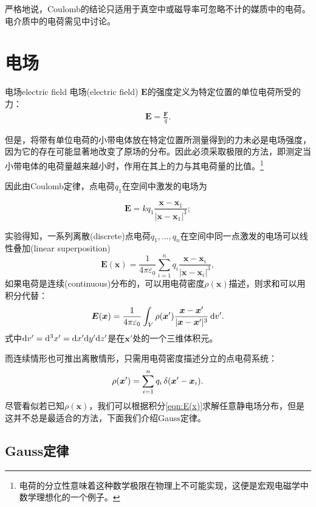 严格地说，Coulomb的结论只适用于真空中或磁导率可忽略不计的媒质中的电荷。电介质中的电荷需见中讨论。

\section{电场}

\begin{definition}{电场}{electric field}
    电场(electric field) $\bm E$的强度定义为特定位置的单位电荷所受的力：
    \begin{align}
        \bm E=\frac{\bm F}q.%
    \end{align}
\end{definition}
但是，将带有单位电荷的小带电体放在特定位置所测量得到的力未必是电场强度，因为它的存在可能显著地改变了原场的分布。因此必须采取极限的方法，即测定当小带电体的电荷量越来越小时，作用在其上的力与其电荷量的比值。\footnote{电荷的分立性意味着这种数学极限在物理上不可能实现，这便是宏观电磁学中数学理想化的一个例子。}

因此由Coulomb定律，点电荷$q_1$在空间中激发的电场为

\begin{equation}
    \label{eqn:E of q}
    \bm E=kq_1\frac{\bm x-\bm x_1}{|\bm x-\bm x_1|^3};
\end{equation}

实验得知，一系列离散(discrete)点电荷$q_1,\ldots,q_n$在空间中同一点激发的电场可以线性叠加(linear superposition)
\[
    \bm E(\bm x)=\frac1{4\pi\varepsilon_0}\sum_{i=1}^nq_i\frac{\bm x-\bm x_i}{|\bm x-\bm x_i|^3},
\]
如果电荷是连续(continuous)分布的，可以用电荷密度$\rho(\bm x)$描述，则求和可以用积分代替：
\begin{align}
    \label{eqn:E(x)}
    \bm E(\bm x)=\frac1{4\pi\varepsilon_0}\int_V\rho(\bm x')\frac{\bm x-\bm x'}{|\bm x-\bm x'|^3}\mathop{}\!\mathrm{d} v'.
\end{align}
式中$\mathop{}\!\mathrm{d} v'=\mathop{}\!\mathrm{d}^3x'=\mathop{}\!\mathrm{d} x'\mathrm{d} y'\mathrm{d} z'$是在$\bm x'$处的一个三维体积元。

而连续情形也可推出离散情形，只需用电荷密度描述分立的点电荷系统：
\[
    \rho(\bm x')=\sum_{i=1}^nq_i\mathop{}\!\delta(\bm x'-\bm x_i).
\]
尽管看似若已知$\rho(\bm x)$，我们可以根据积分\eqref{eqn:E(x)}求解任意静电场分布，但是这并不总是最适合的方法，下面我们介绍Gauss定律。

\subsection{Gauss定律}

